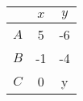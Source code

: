 \begin{center}
    \begin{tabular}{|c|c|c|} 
        \hline
               & $x$ & $y$ \\ 
        \hline
            $A$   & 5 & -6 \\ 
        \hline
            $B$   & -1 & -4\\ 
        \hline
            $C$   & 0 & y\\ 
        \hline
    \end{tabular}
\end{center}  
